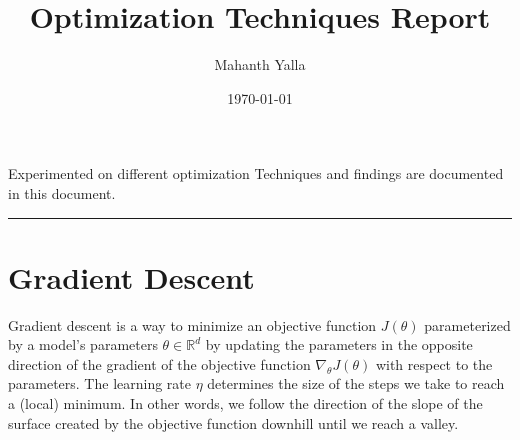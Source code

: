 \documentclass[10pt,twocolumn]{article}
\title{
  \Large Optimization Techniques Report  \\
  [10pt] 
  }
\date{\today}
\author{Mahanth Yalla}
\makeatletter
\renewenvironment{abstract} %
{\small
\begin{center}
  \bfseries \abstractname\vspace{-.5em}\vspace{0pt}
\end{center}
\list{}{%
\setlength{\leftmargin}{0mm}
\setlength{\rightmargin}{\leftmargin}%
}
\item\relax}
{\endlist}
\renewcommand{\maketitle}{\bgroup\setlength{\parindent}{0pt} %
\begin{flushleft}
  \textbf{\@title}
  \@author \\ 
  \@date
\end{flushleft}\egroup
}
\makeatother
\begin{document}
  \twocolumn[ \maketitle ]
  
  \begin{abstract}
    Experimented on different optimization Techniques and findings are documented in this document.
  \end{abstract}
  
  \rule{\linewidth}{0.5pt}
  
  
  \section{Gradient Descent}
  Gradient descent is a way to minimize an objective function $J(\theta)$ parameterized by a model's 
  parameters $\theta \in \mathbb{R}^d$ by updating the parameters in the opposite direction of the gradient 
  of the objective function $ \nabla_{\theta}J(\theta)$ with respect to the parameters. The learning rate $\eta$ 
  determines the size of the steps we take to reach a (local) minimum. In other words, we follow the direction of the slope of the surface created by the objective function downhill until we reach a valley.
  \cite{DBLP:journals/corr/Ruder16}
  
\end{document}
